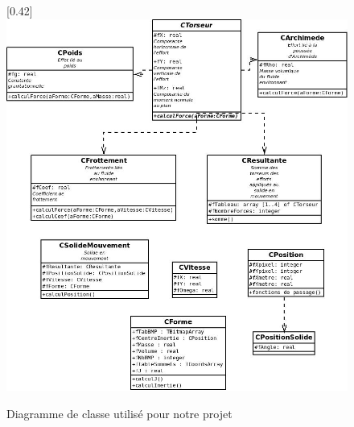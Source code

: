 \begin{center}
\begin{figure}[h]
\begin{center}
\scalebox{0.5}[0.42]{\includegraphics*{../images/UML.jpeg}}
\end{center}
\caption{Diagramme de classe utilisé pour notre projet}
\end{figure}
\end{center}
%
